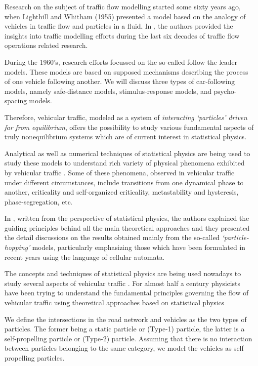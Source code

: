 \documentclass[a4paper,12pt]{scrartcl}
\begin{document}
Research on the subject of traffic flow modelling started some sixty years ago, when Lighthill and
Whitham (1955) presented a model based on the analogy of vehicles in traffic flow and particles in a
fluid.
In \cite{hoogendoorn2001JSCE}, the authors provided the insights into traffic modelling efforts during the last six decades of traffic flow operations related research.

During the 1960’s, research efforts focussed on the so-called follow the leader models. These models
are based on supposed mechanisms describing the process of one vehicle following another. We will
discuss three types of car-following models, namely safe-distance models, stimulus-response models,
and psycho-spacing models.

Therefore, vehicular traffic, modeled as a system of \emph{interacting ‘particles' driven far from equilibrium}, offers the possibility to study various fundamental aspects of truly nonequilibrium systems which are of current interest in statistical physics.

Analytical as well as numerical techniques of statistical physics are being used to study these models to understand rich variety of physical phenomena exhibited by vehicular traffic .
Some of these phenomena, observed in vehicular traffic under different circumstances, include transitions from one dynamical phase to another, criticality and self-organized criticality, metastability and hysteresis, phase-segregation, etc. 

In \cite{chowdhury2000PR}, written from the perspective of statistical physics, the authors explained the guiding principles behind all the main theoretical approaches and they presented the detail discussions on the results obtained mainly from the so-called \emph{‘particle-hopping'} models, particularly emphasizing those which have been formulated in recent years using the language of cellular automata.

The concepts and techniques of statistical physics are being used nowadays to study several
aspects of vehicular traffic \cite{wolf1996WS,schreckenberg1998WS}.
For almost half a century physicists have been trying to understand the fundamental principles governing the flow of vehicular traffic using theoretical approaches based on statistical physics \cite{herman1963SA,prigogine1971TRID}

We define the intersections in the road network and vehicles as the two types of particles. The former being a static particle or (Type-1) particle, the latter is a self-propelling particle or (Type-2) particle. Assuming that there is no interaction between particles belonging to the same category, we model the vehicles as self propelling particles.
\end{document}
